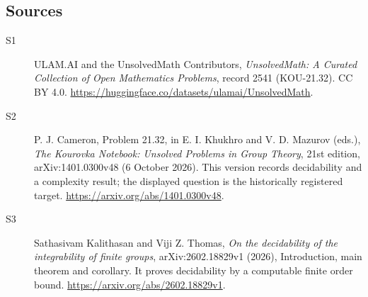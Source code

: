 \documentclass[11pt]{article}
\begin{document}
\subsection{Sources}
\begin{description}
\item[\hypertarget{source:2541:1}{S1}] ULAM.AI and the UnsolvedMath Contributors, \emph{UnsolvedMath: A Curated Collection of Open Mathematics Problems}, record 2541 (KOU-21.32). CC BY 4.0. \url{https://huggingface.co/datasets/ulamai/UnsolvedMath}.
\item[\hypertarget{source:2541:2}{S2}] P. J. Cameron, Problem 21.32, in E. I. Khukhro and V. D. Mazurov (eds.), \emph{The Kourovka Notebook: Unsolved Problems in Group Theory}, 21st edition, arXiv:1401.0300v48 (6 October 2026). This version records decidability and a complexity result; the displayed question is the historically registered target. \url{https://arxiv.org/abs/1401.0300v48}.
\item[\hypertarget{source:2541:3}{S3}] Sathasivam Kalithasan and Viji Z. Thomas, \emph{On the decidability of the integrability of finite groups}, arXiv:2602.18829v1 (2026), Introduction, main theorem and corollary. It proves decidability by a computable finite order bound. \url{https://arxiv.org/abs/2602.18829v1}.
\end{description}
\label{end:2541}
\end{document}
